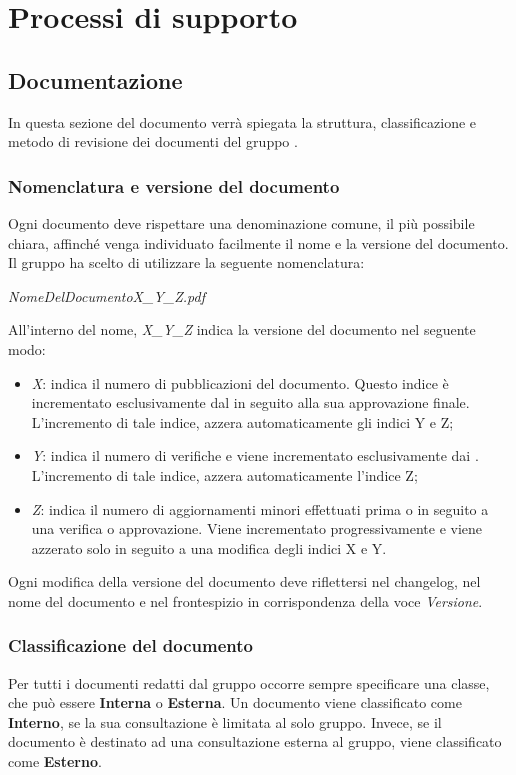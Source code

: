 \newpage

\section{Processi di supporto}

	\subsection{Documentazione}
	In questa sezione del documento verrà spiegata la struttura, classificazione e metodo di revisione dei documenti del gruppo \textit{\gruppo}.
	
		\subsubsection{Nomenclatura e versione del documento}
		Ogni documento deve rispettare una denominazione comune, il più possibile chiara, affinché venga individuato facilmente il nome e la versione del documento. Il gruppo ha scelto di utilizzare la seguente nomenclatura:
		\begin{center}
			\textit{NomeDelDocumentoX\_Y\_Z.pdf}
		\end{center}
		All’interno del nome, \textit{X\_Y\_Z} indica la versione del documento nel seguente modo:
		\begin{itemize}
			\item \textit{X}: indica il numero di pubblicazioni del documento. Questo indice è incrementato esclusivamente dal \textit{\RdP} in seguito alla sua approvazione finale. L’incremento di tale indice, azzera automaticamente gli indici Y e Z;
			\item \textit{Y}: indica il numero di verifiche e viene incrementato esclusivamente dai \textit{\Vers}. L’incremento di tale indice, azzera automaticamente l'indice Z;
			\item \textit{Z}: indica il numero di aggiornamenti minori effettuati prima o in seguito a una verifica o approvazione. Viene incrementato progressivamente e viene azzerato solo in seguito a una modifica degli indici X e Y.
		\end{itemize}
		Ogni modifica della versione del documento deve riflettersi nel changelog, nel nome del documento e nel frontespizio in corrispondenza della voce \textit{Versione}.
	
		\subsubsection{Classificazione del documento}
		Per tutti i documenti redatti dal gruppo occorre sempre specificare una classe, che può essere \textbf{Interna} o \textbf{Esterna}.
		Un documento viene classificato come \textbf{Interno}, se la sua consultazione è limitata al solo gruppo. Invece, se il documento è destinato ad una consultazione esterna al gruppo, viene classificato come \textbf{Esterno}.
	
